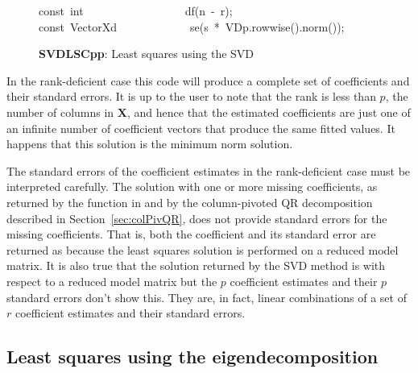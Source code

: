 \documentclass[shortnames,article]{jss}
\newcommand{\hlstd}[1]{\textcolor[rgb]{0,0,0}{#1}}
\newcommand{\hlopt}[1]{\textcolor[rgb]{0,0,0}{#1}}
\newcommand{\hlkwb}[1]{\textcolor[rgb]{0.13,0.54,0.13}{#1}}
\newcommand{\hlkwd}[1]{\textcolor[rgb]{0,0,0}{#1}}
\begin{document}
\begin{figure}[htb]
    \hlstd{}\hlkwb{const\ int}\hlstd{\ \ \ \ \ \ \ \ \ \ \ \ \ \ \ \ \ \ }\hlkwb{}\hlstd{}\hlkwd{df}\hlstd{}\hlopt{(}\hlstd{n\ }\hlopt{{-}\ }\hlstd{r}\hlopt{);}\hspace*{\fill}\\
    \hlstd{}\hlkwb{const\ }\hlstd{VectorXd}\hlstd{\ \ \ \ \ \ \ \ \ \ \ \ \ }\hlstd{}\hlkwd{se}\hlstd{}\hlopt{(}\hlstd{s\ }\hlopt{{*}\ }\hlstd{VDp}\hlopt{.}\hlstd{}\hlkwd{rowwise}\hlstd{}\hlopt{().}\hlstd{}\hlkwd{norm}\hlstd{}\hlopt{());}\hlstd{}\hspace*{\fill}
    \normalfont
    \normalsize
  \caption{\textbf{SVDLSCpp}: Least squares using the SVD}
  \label{SVDLS}
\end{figure}

In the rank-deficient case this code will produce a complete set of
coefficients and their standard errors.  It is up to the user to note
that the rank is less than $p$, the number of columns in $\bm X$, and
hence that the estimated coefficients are just one of an infinite
number of coefficient vectors that produce the same fitted values.  It
happens that this solution is the minimum norm solution.

The standard errors of the coefficient estimates in the rank-deficient
case must be interpreted carefully.  The solution with one or more missing
coefficients, as returned by the  function in
 and by the column-pivoted QR decomposition described in
Section~\ref{sec:colPivQR}, does not provide standard errors for the
missing coefficients.  That is, both the coefficient and its standard
error are returned as  because the least squares solution is
performed on a reduced model matrix.  It is also true that the
solution returned by the SVD method is with respect to a reduced model
matrix but the $p$ coefficient estimates and their $p$ standard errors
don't show this.  They are, in fact, linear combinations of a set of
$r$ coefficient estimates and their standard errors.

\subsection{Least squares using the eigendecomposition}
\label{sec:eigendecomp}
\end{document}
